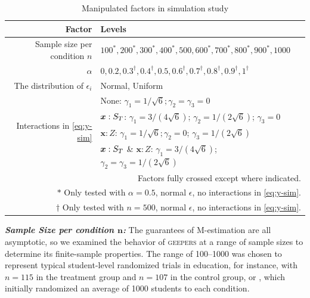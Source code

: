 \documentclass[]{article}
\begin{document}
\begin{table}
    \caption{\label{tab:factor} Manipulated factors in simulation study}
  \centering
\begin{tabular}{r|ll}%
  \hline
  Factor &\multicolumn{2}{l}{Levels}\\
  \hline
Sample size per condition $n$ &\multicolumn{2}{l}{$100^*,200^*,300^*,400^*,500,600^*,700^*,800^*,900^*,1000$}\\
$\alpha$ &\multicolumn{2}{l}{$0,0.2,0.3^\dagger,0.4^\dagger,0.5,0.6^\dagger,0.7^\dagger,0.8^\dagger,0.9^\dagger,1^\dagger$}\\
The distribution of $\epsilon_i$&\multicolumn{2}{l}{ Normal, Uniform}\\
\multirow{4}{*}{Interactions in \eqref{eq:y-sim}}& None:  $\gamma_1=1/\sqrt{6};\gamma_2=\gamma_3=0$\\ 
& $\bm{x}:S_T$: $\gamma_1=3/(4\sqrt{6})$; $\gamma_2=1/(2\sqrt{6})$; $\gamma_3=0$\\
& $\bm{x}:Z$: $\gamma_1=1/\sqrt{6};\gamma_2=0$; $\gamma_3=1/(2\sqrt{6})$\\
& $\bm{x}:S_T$ \& $\bm{x}:Z$: $\gamma_1=3/(4\sqrt{6})$; $\gamma_2=\gamma_3=1/(2\sqrt{6})$\\
\hline
\multicolumn{3}{p{4.5in}}{\footnotesize Factors fully crossed except where indicated.}\\
\multicolumn{3}{p{4.5in}}{\footnotesize $*$ Only tested with $\alpha=0.5$, normal $\epsilon$, no interactions in \eqref{eq:y-sim}.}\\
\multicolumn{3}{p{4.5in}}{\footnotesize $\dagger$ Only tested with $n=500$, normal $\epsilon$, no interactions in \eqref{eq:y-sim}.}

\end{tabular}
\end{table}

\textbf{\emph{Sample Size per condition $\bm{n}$:}} The guarantees of M-estimation are all asymptotic, so we examined the behavior of \textsc{geepers} at a range of sample sizes to determine its finite-sample properties. The range of 100--1000 was chosen to represent typical student-level randomized trials in education, for instance, \citet{growthMindsetRuralBurnette} with $n=115$ in the treatment group and $n=107$ in the control group, or \citet{impactPaper}, which initially randomized an average of 1000 students to each condition.
\end{document}
